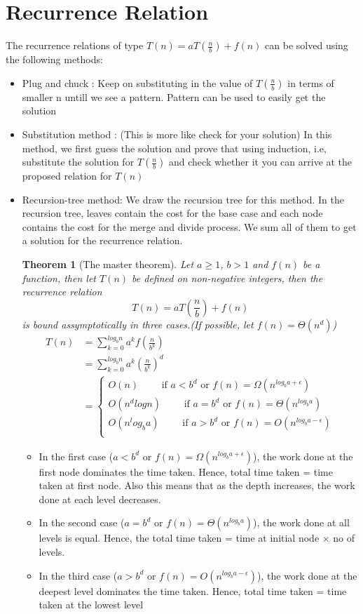 \documentclass{article}
\newtheorem*{theorem}{Theorem}
\begin{document}
\section{Recurrence Relation}
	The recurrence relations of type $T(n) = aT(\frac{n}{b}) + f(n)$ can be solved using the following methods:\\
	\begin{itemize}
	\item Plug and chuck : Keep on substituting in the value of $T(\frac{n}{b})$ in terms of smaller n untill we see a pattern. Pattern can be used to easily get the solution
	\item Substitution method : (This is more like check for your solution) In this method, we first guess the solution and prove that using induction, i.e, substitute the solution for $T(\frac{n}{b})$ and check whether it you can arrive at the proposed relation for $T(n)$
	\item Recursion-tree method: We draw the recursion tree for this method. In the recursion tree, leaves contain the cost for the base case and each node contains the cost for the merge and divide process. We sum all of them to get a solution for the recurrence relation. 

	\begin{theorem}[The master theorem]
	Let $a\geq 1$, $b>1$ and $f(n)$ be a function, then let $T(n)$ be defined on non-negative integers, then the recurrence relation
	\[T(n) = aT(\frac{n}{b}) + f(n) \] is bound assymptotically in three cases.(If possible, let $f(n)= \Theta(n^d)$)
	\begin{align*}
		T(n) &= \sum_{k=0}^{log_bn} a^k f(\frac{n}{b^k})\\
			&= \sum_{k=0}^{log_bn} a^k (\frac{n}{b^k})^d\\ 
			&= 
		\begin{cases}
		O(n) \qquad\text{ if } a<b^d\text{ or }f(n)= \Omega(n^{log_ba+\epsilon})\\
		O(n^d logn) \qquad \text{ if } a=b^d\text{ or }f(n)= \Theta(n^{log_ba})\\
		O(n^log_ba) \qquad \text{ if } a>b^d\text{ or }f(n)= O(n^{log_ba-\epsilon})\\
		\end{cases}	
	\end{align*}
	\end{theorem}

	\begin{itemize}
	\item In the first case ($a<b^d\text{ or }f(n)= \Omega(n^{log_ba+\epsilon})$), the work done at the first node dominates the time taken. Hence, total time taken = time taken at first node. Also this means that as the depth increases, the work done at each level decreases. 
	\item In the second case ($a=b^d\text{ or }f(n)= \Theta(n^{log_ba})$), the work done at all levels is equal. Hence, the total time taken = time at initial node $\times$ no of levels.
	\item In the third case ($a>b^d\text{ or }f(n)= O(n^{log_ba-\epsilon})$), the work done at the deepest level dominates the time taken. Hence, total time taken = time taken at the lowest level
	\end{itemize}



\end{itemize}
\end{document}
